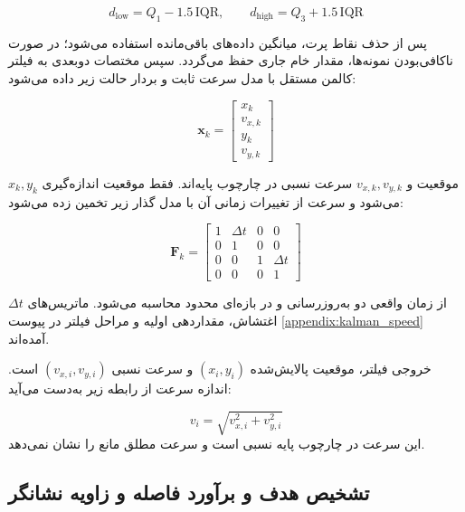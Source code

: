 \begin{equation}
	d_{\mathrm{low}} = Q_1 - 1.5\,\mathrm{IQR},
	\qquad
	d_{\mathrm{high}} = Q_3 + 1.5\,\mathrm{IQR}
	\label{eq:iqr_bounds}
\end{equation}

پس از حذف نقاط پرت، میانگین داده‌های باقی‌مانده استفاده می‌شود؛ در صورت ناکافی‌بودن نمونه‌ها، مقدار خام جاری حفظ می‌گردد. سپس مختصات دوبعدی به فیلتر کالمن مستقل با مدل سرعت ثابت و بردار حالت زیر داده می‌شود:

\begin{equation}
	\mathbf{x}_k =
	\begin{bmatrix}
		x_k \\
		v_{x,k} \\
		y_k \\
		v_{y,k}
	\end{bmatrix}
	\label{eq:kalman_state_obstacle}
\end{equation}

\(x_k,y_k\) موقعیت و \(v_{x,k},v_{y,k}\) سرعت نسبی در چارچوب پایه‌اند. فقط موقعیت اندازه‌گیری می‌شود و سرعت از تغییرات زمانی آن با مدل گذار زیر تخمین زده می‌شود:

\begin{equation}
	\mathbf{F}_k =
	\begin{bmatrix}
		1 & \Delta t & 0 & 0 \\
		0 & 1        & 0 & 0 \\
		0 & 0        & 1 & \Delta t \\
		0 & 0        & 0 & 1
	\end{bmatrix}
	\label{eq:kalman_transition_obstacle}
\end{equation}

\(\Delta t\) از زمان واقعی دو به‌روزرسانی و در بازه‌ای محدود محاسبه می‌شود. ماتریس‌های اغتشاش، مقداردهی اولیه و مراحل فیلتر در پیوست \ref{appendix:kalman_speed} آمده‌اند.

خروجی فیلتر، موقعیت پالایش‌شده \((x_i,y_i)\) و سرعت نسبی \((v_{x,i},v_{y,i})\) است. اندازه سرعت از رابطه زیر به‌دست می‌آید:

\begin{equation}
	v_i =
	\sqrt{
		v_{x,i}^{2}
		+
		v_{y,i}^{2}
	}
	\label{eq:obstacle_speed}
\end{equation}
این سرعت در چارچوب پایه نسبی است و سرعت مطلق مانع را نشان نمی‌دهد.
\subsection{تشخیص هدف و برآورد فاصله و زاویه نشانگر}
\label{subsec:goal_marker_detection}

